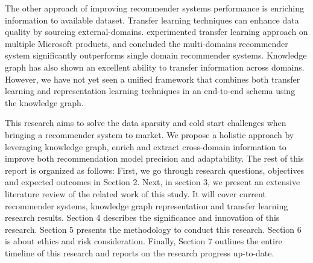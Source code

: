 The other approach of improving recommender systems performance is enriching information to available dataset. Transfer learning \citep{Pan2010} techniques can enhance data quality by sourcing external-domains. \citet{Elkahky2015} experimented transfer learning approach on multiple Microsoft products, and concluded the multi-domains recommender system significantly outperforms single domain recommender systems. Knowledge graph has also shown an excellent ability to transfer information across domains. However, we have not yet seen a unified framework that combines both transfer learning and representation learning techniques in an end-to-end schema using the knowledge graph.

This research aims to solve the data sparsity and cold start challenges when bringing a recommender system to market. We propose a holistic approach by leveraging knowledge graph, enrich and extract cross-domain information to improve both recommendation model precision and adaptability. The rest of this report is organized as follows: 
First, we go through research questions, objectives and expected outcomes in Section 2. Next, in section 3, we present an extensive literature review of the related work of this study. It will cover current recommender systems, knowledge graph representation and transfer learning research results. Section 4 describes the significance and innovation of this research. Section 5 presents the methodology to conduct this research. Section 6 is about ethics and risk consideration. Finally, Section 7 outlines the entire timeline of this research and reports on the research progress up-to-date.